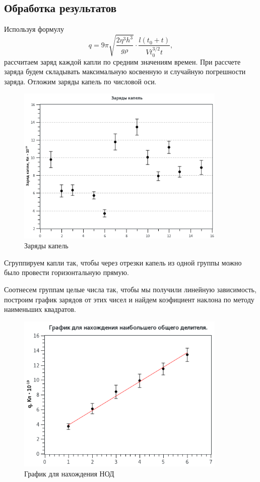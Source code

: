 \documentclass{article}
\begin{document}
   \subsection*{Обработка результатов}
   Используя формулу
   \[ q = 9\pi\sqrt{\frac{2\eta^3 h^3}{g\rho}} \cdot \frac{l(t_0 + t)}{Vt_0^{3/2}t}, \]
   рассчитаем заряд каждой капли по средним значениям времен. При рассчете заряда будем складывать максимальную косвенную и случайную погрешности заряда. Отложим заряды капель по числовой оси.
   
   \begin{figure}[h]
   \centering
   \includegraphics[width=10cm]{plot1.png} 
   \caption{Заряды капель} 
   \label{plot.1} 
   \end{figure}

   Сгруппируем капли так, чтобы через отрезки капель из одной группы можно было провести горизонтальную прямую.
    
   
   Соотнесем группам целые числа так, чтобы мы получили линейную зависимость, построим график зарядов от этих чисел и найдем коэфициент наклона по методу наименьших квадратов.
   \begin{figure}[h]
   \centering
   \includegraphics[width=10cm]{plot2.png} 
   \caption{График для нахождения НОД} 
   \label{plot.2} 
   \end{figure}
\end{document}

